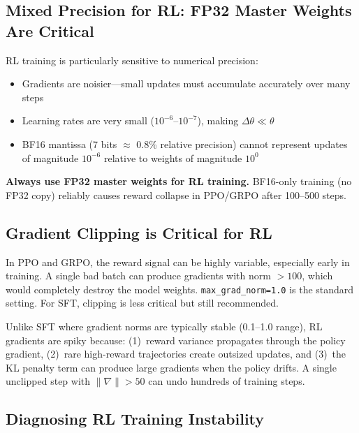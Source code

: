 \subsection{Mixed Precision for RL: FP32 Master Weights Are Critical}
\label{mixed-precision-for-rl-fp32-master-weights-are-critical}

RL training is particularly sensitive to numerical precision:

\begin{itemize}
  \item Gradients are noisier---small updates must accumulate accurately over many steps
  \item Learning rates are very small ($10^{-6}$--$10^{-7}$), making $\Delta\theta \ll \theta$
  \item BF16 mantissa (7 bits $\approx$ 0.8\% relative precision) cannot represent updates of magnitude $10^{-6}$ relative to weights of magnitude $10^{0}$
\end{itemize}

\textbf{Always use FP32 master weights for RL training.} BF16-only training (no FP32 copy) reliably causes reward collapse in PPO/GRPO after 100--500 steps.

\subsection{Gradient Clipping is Critical for RL}
\label{gradient-clipping-is-critical-for-rl}

In PPO and GRPO, the reward signal can be highly variable, especially early in training. A single bad batch can produce gradients with norm $>100$, which would completely destroy the model weights. \texttt{max\_grad\_norm=1.0} is the standard setting. For SFT, clipping is less critical but still recommended.

\begin{warningbox}
Unlike SFT where gradient norms are typically stable (0.1--1.0 range), RL gradients are spiky because: (1)~reward variance propagates through the policy gradient, (2)~rare high-reward trajectories create outsized updates, and (3)~the KL penalty term can produce large gradients when the policy drifts. A single unclipped step with $\|\nabla\| > 50$ can undo hundreds of training steps.
\end{warningbox}

\subsection{Diagnosing RL Training Instability}
\label{diagnosing-rl-training-instability}

